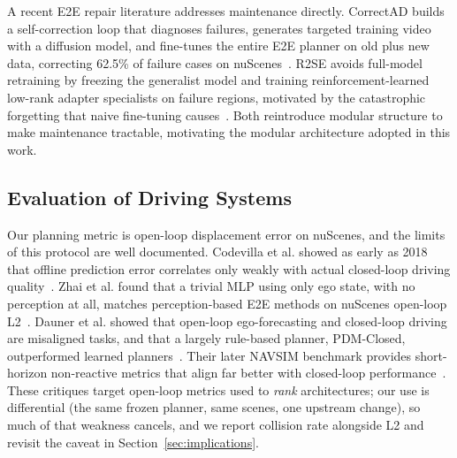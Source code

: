 \documentclass[conference]{IEEEtran}
\begin{document}
A recent E2E repair literature addresses maintenance directly. CorrectAD
builds a self-correction loop that diagnoses failures, generates targeted
training video with a diffusion model, and fine-tunes the entire E2E planner
on old plus new data, correcting 62.5\% of failure cases on
nuScenes~\cite{ma2025correctad}. R2SE avoids full-model retraining by freezing
the generalist model and training reinforcement-learned low-rank adapter
specialists on failure regions, motivated by the catastrophic forgetting that
naive fine-tuning causes~\cite{liu2025r2se}. Both reintroduce modular structure
to make maintenance tractable, motivating the modular architecture adopted in
this work.

\subsection{Evaluation of Driving Systems}
Our planning metric is open-loop displacement error on nuScenes, and the
limits of this protocol are well documented. Codevilla et al. showed as early
as 2018 that offline prediction error correlates only weakly with actual
closed-loop driving quality~\cite{codevilla2018offline}. Zhai et al. found
that a trivial MLP using only ego state, with no perception at all, matches
perception-based E2E methods on nuScenes open-loop
L2~\cite{zhai2023rethinking}. Dauner et al. showed that open-loop
ego-forecasting and closed-loop driving are misaligned tasks, and that a
largely rule-based planner, PDM-Closed, outperformed learned
planners~\cite{dauner2023parting}. Their later NAVSIM benchmark provides
short-horizon non-reactive metrics that align far better with closed-loop
performance~\cite{dauner2024navsim}. These critiques target open-loop metrics
used to \emph{rank} architectures; our use is differential (the same frozen
planner, same scenes, one upstream change), so much of that weakness cancels,
and we report collision rate alongside L2 and revisit the caveat in
Section~\ref{sec:implications}.
\end{document}
